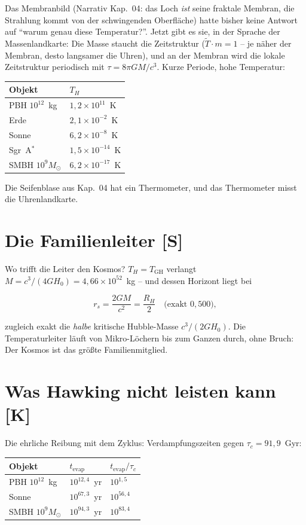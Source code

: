 \documentclass[11pt]{report}
\begin{document}
Das Membranbild (Narrativ Kap.~04: das Loch \emph{ist} seine
fraktale Membran, die Strahlung kommt von der schwingenden
Oberfläche) hatte bisher keine Antwort auf \enquote{warum genau
diese Temperatur?}. Jetzt gibt es sie, in der Sprache der
Massenlandkarte: Die Masse staucht die Zeitstruktur
($\tilde T \cdot m = 1$ -- je näher der Membran, desto langsamer
die Uhren), und an der Membran wird die lokale Zeitstruktur
periodisch mit $\tau = 8\pi GM/c^3$. Kurze Periode, hohe
Temperatur:

\begin{center}
\begin{tabular}{ll}
\toprule
Objekt & $T_H$ \\
\midrule
PBH $10^{12}$~kg & $1{,}2\times10^{11}$~K \\
Erde & $2{,}1\times10^{-2}$~K \\
Sonne & $6{,}2\times10^{-8}$~K \\
Sgr~A$^{*}$ & $1{,}5\times10^{-14}$~K \\
SMBH $10^{9}M_\odot$ & $6{,}2\times10^{-17}$~K \\
\bottomrule
\end{tabular}
\end{center}

Die Seifenblase aus Kap.~04 hat ein Thermometer, und das
Thermometer misst die Uhrenlandkarte.

\section{Die Familienleiter [S]}

Wo trifft die Leiter den Kosmos? $T_H = T_\text{GH}$ verlangt
$M = c^3/(4GH_0) = 4{,}66\times10^{52}$~kg -- und dessen
Horizont liegt bei

\[
  r_s = \frac{2GM}{c^2} = \frac{R_H}{2} \quad\text{(exakt } 0{,}500\text{)},
\]

zugleich exakt die \emph{halbe} kritische Hubble-Masse
$c^3/(2GH_0)$. Die Temperaturleiter läuft von Mikro-Löchern bis
zum Ganzen durch, ohne Bruch: Der Kosmos ist das größte
Familienmitglied.

\section{Was Hawking nicht leisten kann [K]}

Die ehrliche Reibung mit dem Zyklus: Verdampfungszeiten gegen
$\tau_c = 91{,}9$~Gyr:

\begin{center}
\begin{tabular}{lll}
\toprule
Objekt & $t_\text{evap}$ & $t_\text{evap}/\tau_c$ \\
\midrule
PBH $10^{12}$~kg & $10^{12{,}4}$~yr & $10^{1{,}5}$ \\
Sonne & $10^{67{,}3}$~yr & $10^{56{,}4}$ \\
SMBH $10^{9}M_\odot$ & $10^{94{,}3}$~yr & $10^{83{,}4}$ \\
\bottomrule
\end{tabular}
\end{center}
\end{document}
